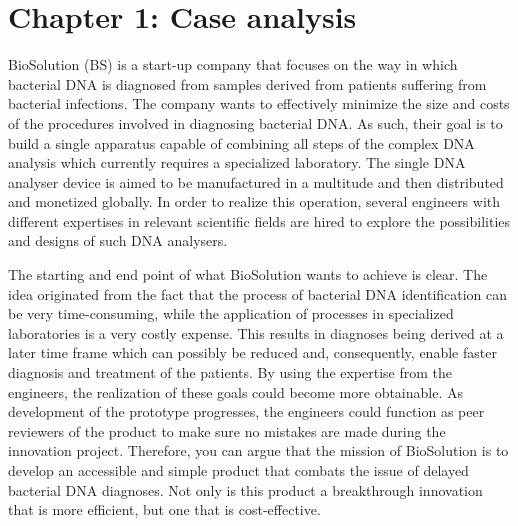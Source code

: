 \documentclass[a4paper,10pt,UTF8]{scrartcl}
\begin{document}
\section{Chapter 1: Case analysis}

BioSolution (BS) is a start-up company that focuses on the way in which bacterial DNA is diagnosed from samples derived from patients suffering from bacterial infections. The company wants to effectively minimize the size and costs of the procedures involved in diagnosing bacterial DNA. As such, their goal is to build a single apparatus capable of combining all steps of the complex DNA analysis which currently requires a specialized laboratory. The single DNA analyser device is aimed to be manufactured in a multitude and then distributed and monetized globally. In order to realize this operation, several engineers with different expertises in relevant scientific fields are hired to explore the possibilities and designs of such DNA analysers. 

The starting and end point of what BioSolution wants to achieve is clear. The idea originated from the fact that the process of bacterial DNA identification can be very time-consuming, while the application of processes in specialized laboratories is a very costly expense. This results in diagnoses being derived at a later time frame which can possibly be reduced and, consequently, enable faster diagnosis and treatment of the patients. By using the expertise from the engineers, the realization of these goals could become more obtainable. As development of the prototype progresses, the engineers could function as peer reviewers of the product to make sure no mistakes are made during the innovation project. Therefore, you can argue that the mission of BioSolution is to develop an accessible and simple product that combats the issue of delayed bacterial DNA diagnoses. Not only is this product a breakthrough innovation that is more efficient, but one that is cost-effective.
\end{document}
